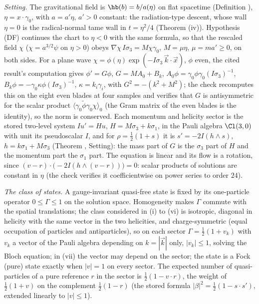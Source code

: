 \emph{Setting.} The gravitational field is $\hb(b) = b/a(\eta)$ on flat spacetime (Definition ), $\eta = x\cdot\gamma_{0}$, with $a = a'\eta$, $a' > 0$ constant: the radiation-type descent, whose wall $\eta = 0$ is the radical-normal tame wall in $t = \eta^{2}/4$ (Theorem (iv)). Hypothesis (DF) continues the chart to $\eta < 0$ with the same formula, so that the rescaled field $\chi$ ($\chi = a^{3/2}\psi$ on $\eta > 0$) obeys $\nabla\chi\,I\sigma_{3} = M\chi\gamma_{0}$, $M = \mu\eta$, $\mu = ma' \ge 0$, on both sides. For a plane wave $\chi = \phi(\eta)\exp(-I\sigma_{3}\,\vec k\cdot\vec x)$, $\phi$ even, the cited result's computation gives $\phi' = G\phi$, $G = MA_{0} + B_{k}$, $A_{0}\phi = \gamma_{0}\phi\gamma_{0}(I\sigma_{3})^{-1}$, $B_{k}\phi = -\gamma_{0}\kappa\phi(I\sigma_{3})^{-1}$, $\kappa = k_{i}\gamma_{i}$, with $G^{2} = -(k^{2} + M^{2})$; the check recomputes this on the eight even blades at four samples and verifies that $G$ is antisymmetric for the scalar product $\langle\gamma_{0}\tilde\phi\gamma_{0}\chi\rangle_{0}$ (the Gram matrix of the even blades is the identity), so the norm is conserved. Each momentum and helicity sector is the stored two-level system $Iu' = Hu$, $H = M\sigma_{3} + k\sigma_{1}$, in the Pauli algebra $\Cl(3,0)$ with unit its pseudoscalar $I$, and for $\rho = \tfrac12(1 + s)$ it is $s' = -2I(h\wedge s)$, $h = k\sigma_{1} + M\sigma_{3}$ (Theorem , Setting): the mass part of $G$ is the $\sigma_{3}$ part of $H$ and the momentum part the $\sigma_{1}$ part. The equation is linear and its flow is a rotation, since $(v - r)\cdot\bigl(-2I(h\wedge(v - r))\bigr) = 0$: scalar products of solutions are constant in $\eta$ (the check verifies it coefficientwise on power series to order $24$).

\emph{The class of states.} A gauge-invariant quasi-free state is fixed by its one-particle operator $0 \le \Gamma \le 1$ on the solution space. Homogeneity makes $\Gamma$ commute with the spatial translations; the class considered in (i) to (vi) is isotropic, diagonal in helicity with the same vector in the two helicities, and charge-symmetric (equal occupation of particles and antiparticles), so on each sector $\Gamma = \tfrac12(1 + v_{k})$ with $v_{k}$ a vector of the Pauli algebra depending on $k = |\vec k|$ only, $|v_{k}| \le 1$, solving the Bloch equation; in (vii) the vector may depend on the sector; the state is a Fock (pure) state exactly when $|v| = 1$ on every sector. The expected number of quasi-particles of a pure reference $r$ in the sector is $\tfrac12(1 - v\cdot r)$, the weight of $\tfrac12(1 + v)$ on the complement $\tfrac12(1 - r)$ (the stored formula $|\beta|^{2} = \tfrac12(1 - s\cdot s')$, extended linearly to $|v| \le 1$).

